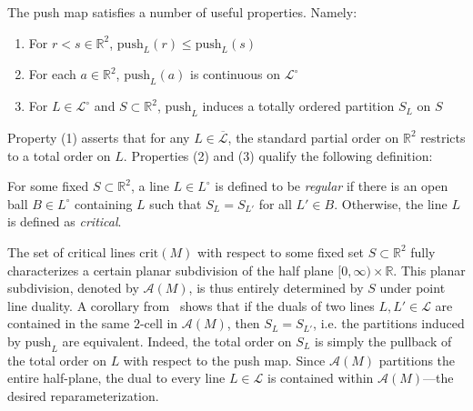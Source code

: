 \documentclass{siamart190516}
\begin{document}
The push map satisfies a number of useful properties. Namely: 
\begin{enumerate}
	\item For $r < s \in \mathbb{R}^2$, $\mathrm{push}_L(r) \leq \mathrm{push}_L(s)$
	\item For each $a \in \mathbb{R}^2$, $\mathrm{push}_L(a)$ is continuous on $\mathcal{L}^\circ$
	\item For $L \in \mathcal{L}^\circ$ and $S \subset \mathbb{R}^2$, $\mathrm{push}_L$ induces a totally ordered partition $S_L$ on $S$ 
\end{enumerate}
Property (1) asserts that for any $L \in \overline{\mathcal{L}}$, the standard partial order on $\mathbb{R}^2$ restricts to a total order on $L$. Properties (2) and (3) qualify the following definition:
\begin{definition}
	For some fixed $S \subset \mathbb{R}^2$, a line $L \in L^\circ$ is defined to be \emph{regular} if there is an open ball $B \in L^\circ$ containing $L$ such that $S_L = S_{L'}$ for all $L' \in B$. Otherwise, the line $L$ is defined as \emph{critical}. 
\end{definition}
\noindent The set of critical lines $\mathrm{crit}(M)$ with respect to some fixed set $S \subset \mathbb{R}^2$ fully characterizes a certain planar subdivision of the half plane $[0, \infty) \times \mathbb{R}$. 
This planar subdivision, denoted by $\mathcal{A}(M)$, is thus entirely determined by $S$ under point line duality.
A corollary from~\cite{lesnick2015interactive} shows that if the duals of two lines $L, L' \in \mathcal{L}$ are contained in the same $2$-cell in $\mathcal{A}(M)$, then $S_L = S_{L'}$, i.e. the partitions induced by $\mathrm{push}_L$ are equivalent. Indeed, the total order on $S_L$ is simply the pullback of the total order on $L$ with respect to the push map.
Since $\mathcal{A}(M)$ partitions the entire half-plane, the dual to every line $L \in \mathcal{L}$ is contained within $\mathcal{A}(M)$---the desired reparameterization. 
\end{document}
